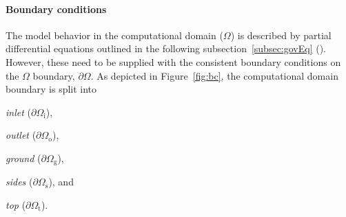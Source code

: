 \paragraph{Boundary conditions} The model behavior in the computational domain ($\Omega$) is described by partial differential equations outlined in the following subsection~\ref{subsec:govEq} (). However, these need to be supplied with the consistent boundary conditions on the $\Omega$ boundary, $\partial\Omega$. As depicted in Figure~\ref{fig:bc}, the computational domain boundary is split into 
\begin{inparaenum}[(i)]
    \item \textit{inlet} ($\partial\Omega_{\mathrm{i}}$),
    \item \textit{outlet} ($\partial\Omega_{\mathrm{o}}$),
    \item \textit{ground} ($\partial\Omega_{\mathrm{g}}$),
    \item \textit{sides} ($\partial\Omega_{\mathrm{s}}$), and
    \item \textit{top} ($\partial\Omega_{\mathrm{t}}$).
\end{inparaenum}
 
